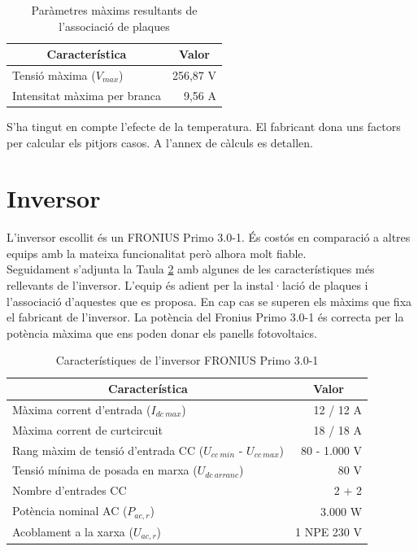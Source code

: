 \begin{table}[H]
\small
  \centering
    \begin{tabular} {|l|r|}
 \hline  
 \multicolumn{1}{|c|}{Característica} &  \multicolumn{1}{c|}{Valor} \\ \hline \hline
	Tensió màxima ($V_{max}$) & 256,87 V \\ \hline
	Intensitat màxima per branca & 9,56 A \\ \hline
    \end{tabular}%
\caption{Paràmetres màxims resultants de l'associació de plaques}
\label{tab:maxs}
\end{table}%

\noindent S'ha tingut en compte l'efecte de la temperatura. El fabricant dona uns factors per calcular els pitjors casos. A l'annex de càlculs es detallen.

\section{Inversor}

L'inversor escollit és un FRONIUS Primo 3.0-1. És costós en comparació a altres equips amb la mateixa funcionalitat però alhora molt fiable.\\
\newline Seguidament s'adjunta la Taula \ref{tab:inversor} amb algunes de les característiques més rellevants de l'inversor. L'equip és adient per la instal·lació de plaques i l'associació d'aquestes que es proposa. En cap cas se superen els màxims que fixa el fabricant de l'inversor. La potència del Fronius Primo 3.0-1 és correcta per la potència màxima que ens poden donar els panells fotovoltaics.
\begin{table}[H]
\small
  \centering
    \begin{tabular} {|l|r|} \hline
  \multicolumn{1}{|c|}{Característica} &  \multicolumn{1}{c|}{Valor}\\ \hline \hline
	Màxima corrent d'entrada ($I_{dc \ max}$) & 12 / 12 A \\ \hline
	Màxima corrent de curtcircuit & 18 / 18 A \\ \hline
	Rang màxim de tensió d'entrada CC ($U_{cc \ min}$ - $U_{cc \ max}$) & 80 - 1.000 V \\ \hline
	Tensió mínima de posada en marxa ($U_{dc \ arranc}$) & 80 V \\ \hline
	Nombre d'entrades CC & 2 + 2 \\ \hline
	Potència nominal AC ($P_{ac,r}$) & 3.000 W \\ \hline
	Acoblament a la xarxa ($U_{ac,r}$) & 1 NPE 230 V \\ \hline
	
    \end{tabular}%
  \label{tab:addlabel}%
  \caption{Característiques de l'inversor FRONIUS Primo 3.0-1}
  \label{tab:inversor}
 \end{table}%

